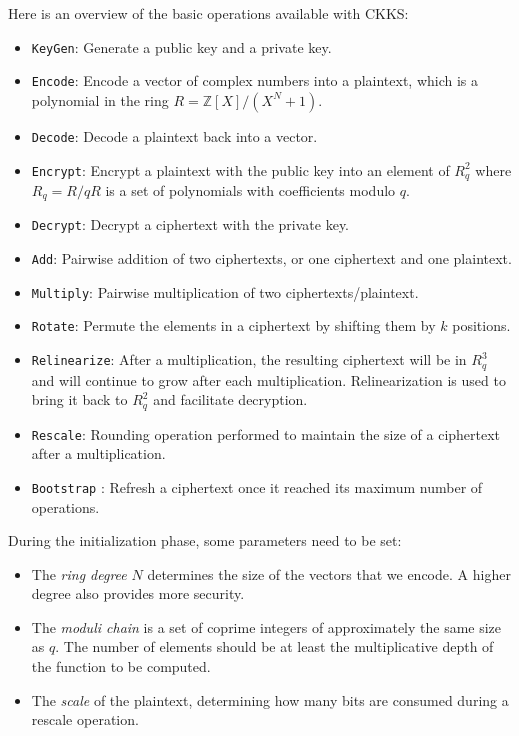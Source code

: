 \documentclass[a4paper,11pt,oneside]{report}
\begin{document}
Here is an overview of the basic operations available with CKKS:
\begin{itemize}
    \item \texttt{KeyGen}: Generate a public key and a private key.
    \item \texttt{Encode}: Encode a vector of complex numbers into a plaintext, which is a polynomial in the ring $R = \mathbb{Z}[X]/(X^N + 1)$.
    \item \texttt{Decode}: Decode a plaintext back into a vector.
    \item \texttt{Encrypt}: Encrypt a plaintext with the public key into an element of $R_q^2$ where $R_q = R/qR$ is a set of polynomials with coefficients modulo $q$.
    \item \texttt{Decrypt}: Decrypt a ciphertext with the private key.
    \item \texttt{Add}: Pairwise addition of two ciphertexts, or one ciphertext and one plaintext.
    \item \texttt{Multiply}: Pairwise multiplication of two ciphertexts/plaintext.
    \item \texttt{Rotate}: Permute the elements in a ciphertext by shifting them by $k$ positions.
    \item \texttt{Relinearize}: After a multiplication, the resulting ciphertext will be in $R_q^3$ and will continue to grow after each multiplication. 
    Relinearization is used to bring it back to $R_q^2$ and facilitate decryption.
    \item \texttt{Rescale}: Rounding operation performed to maintain the size of a ciphertext after a multiplication.
    \item \texttt{Bootstrap} \cite{cheon_bootstrapping_2018}: Refresh a ciphertext once it reached its maximum number of operations.
\end{itemize}

During the initialization phase, some parameters need to be set:

\begin{itemize}
  \item The \emph{ring degree} $N$ determines the size of the vectors that we encode. A higher degree also provides more security.
  \item The \emph{moduli chain} is a set of coprime integers of approximately the same size as $q$. 
  The number of elements should be at least the multiplicative depth of the function to be computed.
  \item The \emph{scale} of the plaintext, determining how many bits are consumed during a rescale operation.
\end{itemize}
\end{document}
